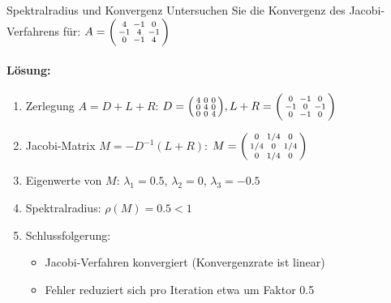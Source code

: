 \begin{example2}{Spektralradius und Konvergenz}
Untersuchen Sie die Konvergenz des Jacobi-Verfahrens für:
$A = \begin{psmallmatrix}
4 & -1 & 0 \\
-1 & 4 & -1 \\
0 & -1 & 4
\end{psmallmatrix}$

\paragraph{Lösung:}
\begin{enumerate}
    \item Zerlegung $A = D + L + R$:
    $D = \begin{psmallmatrix}
    4 & 0 & 0 \\
    0 & 4 & 0 \\
    0 & 0 & 4
    \end{psmallmatrix}, L+R = \begin{psmallmatrix}
    0 & -1 & 0 \\
    -1 & 0 & -1 \\
    0 & -1 & 0
    \end{psmallmatrix}$
    
    \item Jacobi-Matrix $M = -D^{-1}(L+R)$:
    $M = \begin{psmallmatrix}
    0 & 1/4 & 0 \\
    1/4 & 0 & 1/4 \\
    0 & 1/4 & 0
    \end{psmallmatrix}$
    
    \item Eigenwerte von $M$: $\lambda_1 = 0.5$, $\lambda_2 = 0$, $\lambda_3 = -0.5$
    
    \item Spektralradius: $\rho(M) = 0.5 < 1$
    
    \item Schlussfolgerung:
    \begin{itemize}
        \item Jacobi-Verfahren konvergiert (Konvergenzrate ist linear)
        \item Fehler reduziert sich pro Iteration etwa um Faktor 0.5
    \end{itemize}
\end{enumerate}
\end{example2}














